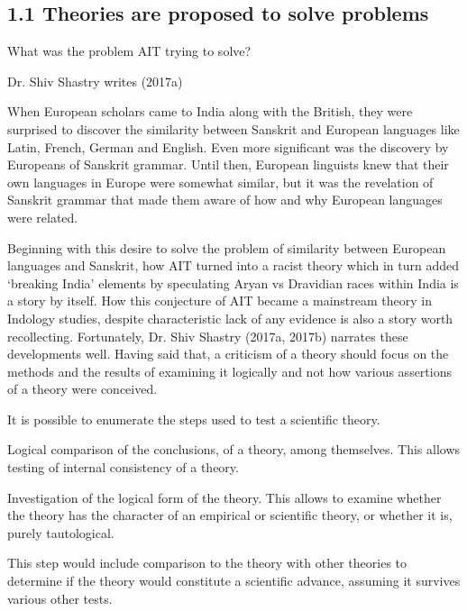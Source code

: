 \subsection{1.1 Theories are proposed to solve problems}

What was the problem AIT trying to solve?

Dr. Shiv Shastry writes (2017a)

\begin{myquote}
When European scholars came to India along with the British, they were surprised to discover the similarity between Sanskrit and European languages like Latin, French, German and English. Even more significant was the discovery by Europeans of Sanskrit grammar. Until then, European linguists knew that their own languages in Europe were somewhat similar, but it was the revelation of Sanskrit grammar that made them aware of how and why European languages were related.
\end{myquote}

Beginning with this desire to solve the problem of similarity between European languages and Sanskrit, how AIT turned into a racist theory which in turn added ‘breaking India’ elements by speculating Aryan vs Dravidian races within India is a story by itself. How this conjecture of AIT became a mainstream theory in Indology studies, despite characteristic lack of any evidence is also a story worth recollecting. Fortunately, Dr. Shiv Shastry (2017a, 2017b) narrates these developments well. Having said that, a criticism of a theory should focus on the methods and the results of examining it logically and not how various assertions of a theory were conceived.

It is possible to enumerate the steps used to test a scientific theory.

\item Logical comparison of the conclusions, of a theory, among themselves. This allows testing of internal consistency of a theory.

 \item Investigation of the logical form of the theory. This allows to examine whether the theory has the character of an empirical or scientific theory, or whether it is, purely tautological.

 \item This step would include comparison to the theory with other theories to determine if the theory would constitute a scientific advance, assuming it survives various other tests.

